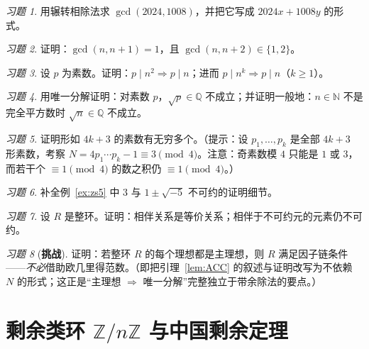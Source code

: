 \documentclass[a4paper,11pt]{ctexart}
\numberwithin{equation}{section}
\theoremstyle{plain}
\theoremstyle{definition}
\theoremstyle{remark}
\newtheorem{exercise}{习题}[section]
\newcommand{\Z}{\mathbb{Z}}
\newcommand{\Q}{\mathbb{Q}}
\newcommand{\N}{\mathbb{N}}
\begin{document}
\begin{exercise}\label{ex:3-1}
用辗转相除法求 $\gcd(2024,1008)$，并把它写成 $2024x+1008y$ 的形式。
\end{exercise}

\begin{exercise}\label{ex:3-2}
证明：$\gcd(n,n+1)=1$，且 $\gcd(n,n+2)\in\{1,2\}$。
\end{exercise}

\begin{exercise}\label{ex:3-3}
设 $p$ 为素数。证明：$p\mid n^2\Rightarrow p\mid n$；进而 $p\mid n^k\Rightarrow p\mid n$（$k\ge1$）。
\end{exercise}

\begin{exercise}\label{ex:3-4}
用唯一分解证明：对素数 $p$，$\sqrt p\in\Q$ 不成立；并证明一般地：$n\in\N$ 不是完全平方数时 $\sqrt n\in\Q$ 不成立。
\end{exercise}

\begin{exercise}\label{ex:3-5}
证明形如 $4k+3$ 的素数有无穷多个。（提示：设 $p_1,\dots,p_k$ 是全部 $4k+3$ 形素数，考察 $N=4p_1\cdots p_k-1\equiv 3\pmod 4$。注意：奇素数模 $4$ 只能是 $1$ 或 $3$，而若干个 $\equiv 1 \pmod 4$ 的数之积仍 $\equiv 1 \pmod 4$。）
\end{exercise}

\begin{exercise}\label{ex:3-6}
补全例~\ref{ex:zs5} 中 $3$ 与 $1\pm\sqrt{-5}$ 不可约的证明细节。
\end{exercise}

\begin{exercise}\label{ex:3-7}
设 $R$ 是整环。证明：相伴关系是等价关系；相伴于不可约元的元素仍不可约。
\end{exercise}

\begin{exercise}[\textbf{挑战}]\label{ex:3-8}
证明：若整环 $R$ 的每个理想都是主理想，则 $R$ 满足因子链条件——\emph{不必}借助欧几里得范数。（即把引理~\ref{lem:ACC} 的叙述与证明改写为不依赖 $N$ 的形式；这正是“主理想 $\Rightarrow$ 唯一分解”完整独立于带余除法的要点。）
\end{exercise}

\newpage

\section{剩余类环 $\Z/n\Z$ 与中国剩余定理}\label{sec:zn}
\end{document}

